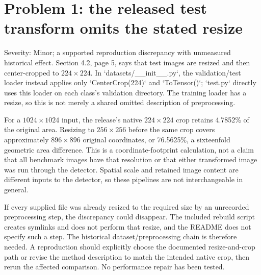 \documentclass[10pt]{article}
\begin{document}
\section*{Problem 1: the released test transform omits the stated resize}
Severity: Minor; a supported reproduction discrepancy with unmeasured historical effect. Section 4.2, page 5, says that test images are resized and then center-cropped to \(224\times224\). In `datasets/\_\_init\_\_.py`, the validation/test loader instead applies only `CenterCrop(224)` and `ToTensor()`; `test.py` directly uses this loader on each class’s validation directory. The training loader has a resize, so this is not merely a shared omitted description of preprocessing.\par
For a \(1024\times1024\) input, the release’s native \(224\times224\) crop retains 4.7852\% of the original area. Resizing to \(256\times256\) before the same crop covers approximately \(896\times896\) original coordinates, or 76.5625\%, a sixteenfold geometric area difference. This is a coordinate-footprint calculation, not a claim that all benchmark images have that resolution or that either transformed image was run through the detector. Spatial scale and retained image content are different inputs to the detector, so these pipelines are not interchangeable in general.\par
If every supplied file was already resized to the required size by an unrecorded preprocessing step, the discrepancy could disappear. The included rebuild script creates symlinks and does not perform that resize, and the README does not specify such a step. The historical dataset/preprocessing chain is therefore needed. A reproduction should explicitly choose the documented resize-and-crop path or revise the method description to match the intended native crop, then rerun the affected comparison. No performance repair has been tested.\par
\end{document}
